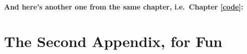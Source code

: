 \documentclass[a4paper,nobind]{templates/ociamthesis}
\newcommand*{\bibtitle}{References}
\begin{document}
\textbf{And here's another one from the same chapter, i.e.~Chapter \ref{code}:}

\hypertarget{the-second-appendix-for-fun}{%
\chapter{The Second Appendix, for Fun}\label{the-second-appendix-for-fun}}




\setlength{\baselineskip}{0pt} %

{\renewcommand*\MakeUppercase[1]{#1}%
\printbibliography[heading=bibintoc,title={\bibtitle}]}
\end{document}
